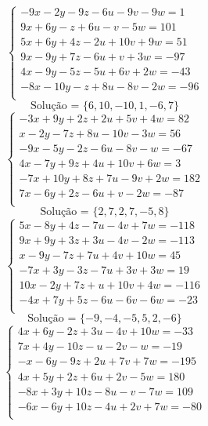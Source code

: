 \documentclass[12pt,oneside,a4paper]{article}
\begin{document}
\vspace{\baselineskip}
\begin{equation*}
\begin{cases}
-9x-2y-9z-6u-9v-9w=1 \\
9x+6y-z+6u-v-5w=101 \\
5x+6y+4z-2u+10v+9w=51 \\
9x-9y+7z-6u+v+3w=-97 \\
4x-9y-5z-5u+6v+2w=-43 \\
-8x-10y-z+8u-8v-2w=-96 \\
\end{cases}
\end{equation*}
\begin{equation*}
\text{Solução = }\{6,10,-10,1,-6,7\}
\end{equation*}
\vspace{\baselineskip}
\begin{equation*}
\begin{cases}
-3x+9y+2z+2u+5v+4w=82 \\
x-2y-7z+8u-10v-3w=56 \\
-9x-5y-2z-6u-8v-w=-67 \\
4x-7y+9z+4u+10v+6w=3 \\
-7x+10y+8z+7u-9v+2w=182 \\
7x-6y+2z-6u+v-2w=-87 \\
\end{cases}
\end{equation*}
\begin{equation*}
\text{Solução = }\{2,7,2,7,-5,8\}
\end{equation*}
\vspace{\baselineskip}
\begin{equation*}
\begin{cases}
5x-8y+4z-7u-4v+7w=-118 \\
9x+9y+3z+3u-4v-2w=-113 \\
x-9y-7z+7u+4v+10w=45 \\
-7x+3y-3z-7u+3v+3w=19 \\
10x-2y+7z+u+10v+4w=-116 \\
-4x+7y+5z-6u-6v-6w=-23 \\
\end{cases}
\end{equation*}
\begin{equation*}
\text{Solução = }\{-9,-4,-5,5,2,-6\}
\end{equation*}
\vspace{\baselineskip}
\begin{equation*}
\begin{cases}
4x+6y-2z+3u-4v+10w=-33 \\
7x+4y-10z-u-2v-w=-19 \\
-x-6y-9z+2u+7v+7w=-195 \\
4x+5y+2z+6u+2v-5w=180 \\
-8x+3y+10z-8u-v-7w=109 \\
-6x-6y+10z-4u+2v+7w=-80 \\
\end{cases}
\end{equation*}
\end{document}
